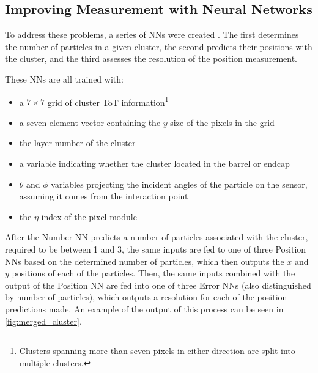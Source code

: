 \subsection{Improving Measurement with Neural Networks}

To address these problems, a series of \acp{NN} were created \cite{PERF-2012-05}. The first determines the number of particles in a given cluster, the second predicts their positions with the cluster, and the third assesses the resolution of the position measurement. 

These \acp{NN} are all trained with: 
\begin{itemize}
\item a $7\times7$ grid of cluster \ac{ToT} information\footnote{Clusters spanning more than seven pixels in either direction are split into multiple clusters.}
\item a seven-element vector containing the $y$-size of the pixels in the grid
\item the layer number of the cluster
\item a variable indicating whether the cluster located in the barrel or endcap
\item $\theta$ and $\phi$ variables projecting the incident angles of the particle on the sensor, assuming it comes from the interaction point
\item the $\eta$ index of the pixel module
\end{itemize}

After the Number \ac{NN} predicts a number of particles associated with the cluster, required to be between 1 and 3, the same inputs are fed to one of three Position \acp{NN} based on the determined number of particles, which then outputs the $x$ and $y$ positions of each of the particles. Then, the same inputs combined with the output of the Position \ac{NN} are fed into one of three Error \acp{NN} (also distinguished by number of particles), which outputs a resolution for each of the position predictions made. An example of the output of this process can be seen in \autoref{fig:merged_cluster}.

